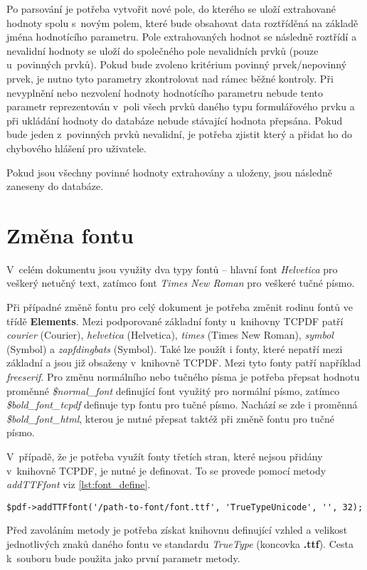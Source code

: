 \par
Po parsování je potřeba vytvořit nové pole, do kterého se uloží extrahované hodnoty spolu s~novým polem, které bude obsahovat data roztříděná na základě jména hodnotícího parametru. Pole extrahovaných hodnot se následně roztřídí a nevalidní hodnoty se uloží do společného pole nevalidních prvků (pouze u~povinných prvků). Pokud bude zvoleno kritérium povinný prvek/nepovinný prvek, je nutno tyto parametry zkontrolovat nad rámec běžné kontroly. Při nevyplnění nebo nezvolení hodnoty hodnotícího parametru nebude tento parametr reprezentován v~poli všech prvků daného typu formulářového prvku a při ukládání hodnoty do databáze nebude stávající hodnota přepsána. Pokud bude jeden z~povinných prvků nevalidní, je potřeba zjistit který a přidat ho do chybového hlášení pro uživatele.
\par
Pokud jsou všechny povinné hodnoty extrahovány a uloženy, jsou následně zaneseny do databáze.

\section{Změna fontu}
V~celém dokumentu jsou využity dva typy fontů -- hlavní font \textit{Helvetica} pro veškerý netučný text, zatímco font \textit{Times New Roman} pro veškeré tučné písmo.
\par
Při případné změně fontu pro celý dokument je potřeba změnit rodinu fontů ve třídě \textbf{Elements}. Mezi podporované základní fonty u~knihovny TCPDF patří \textit{courier} (Courier), \textit{helvetica} (Helvetica), \textit{times} (Times New Roman), \textit{symbol} (Symbol) a \textit{zapfdingbats} (Symbol). Také lze použít i fonty, které nepatří mezi základní a jsou již obsaženy v~knihovně TCPDF. Mezi tyto fonty patří například \textit{freeserif}. Pro změnu normálního nebo tučného písma je potřeba přepsat hodnotu proměnné \textit{\$normal\_font} definující font využitý pro normální písmo, zatímco \textit{\$bold\_font\_tcpdf} definuje typ fontu pro tučné písmo. Nachází se zde i proměnná \textit{\$bold\_font\_html}, kterou je nutné přepsat taktéž při změně fontu pro tučné písmo.
\par
V~případě, že je potřeba využít fonty třetích stran, které nejsou přidány v~knihovně TCPDF, je nutné je definovat. To se provede pomocí metody \textit{addTTFfont} viz  \ref{lst:font_define}.
\begin{lstlisting}[caption = {Nový font vložený do knihovny TCPDF}, label = {lst:font_define}, captionpos=b]
$pdf->addTTFfont('/path-to-font/font.ttf', 'TrueTypeUnicode', '', 32);
\end{lstlisting}
Před zavoláním metody je potřeba získat knihovnu definující vzhled a velikost jednotlivých znaků daného fontu ve standardu \textit{TrueType} (koncovka \textbf{.ttf}). Cesta k~souboru bude použita jako první parametr metody.

